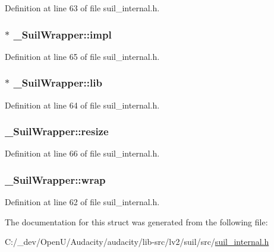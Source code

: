 Definition at line 63 of file suil\+\_\+internal.\+h.

\subsubsection[{\texorpdfstring{impl}{impl}}]{$\ast$ \+\_\+\+Suil\+Wrapper\+::impl}\hypertarget{struct___suil_wrapper_a3b9f069c2fc9e99ad07b07de0994cad7}{}\label{struct___suil_wrapper_a3b9f069c2fc9e99ad07b07de0994cad7}


Definition at line 65 of file suil\+\_\+internal.\+h.

\subsubsection[{\texorpdfstring{lib}{lib}}]{$\ast$ \+\_\+\+Suil\+Wrapper\+::lib}\hypertarget{struct___suil_wrapper_aef41349133c89e26d472c35879599cf4}{}\label{struct___suil_wrapper_aef41349133c89e26d472c35879599cf4}


Definition at line 64 of file suil\+\_\+internal.\+h.

\subsubsection[{\texorpdfstring{resize}{resize}}]{ \+\_\+\+Suil\+Wrapper\+::resize}\hypertarget{struct___suil_wrapper_a881d1aaf73b97b34059360b224b4edc3}{}\label{struct___suil_wrapper_a881d1aaf73b97b34059360b224b4edc3}


Definition at line 66 of file suil\+\_\+internal.\+h.

\subsubsection[{\texorpdfstring{wrap}{wrap}}]{ \+\_\+\+Suil\+Wrapper\+::wrap}\hypertarget{struct___suil_wrapper_afcf34e2f9166985f483b08397ca94276}{}\label{struct___suil_wrapper_afcf34e2f9166985f483b08397ca94276}


Definition at line 62 of file suil\+\_\+internal.\+h.



The documentation for this struct was generated from the following file\+:\begin{DoxyCompactItemize}
\item 
C\+:/\+\_\+dev/\+Open\+U/\+Audacity/audacity/lib-\/src/lv2/suil/src/\hyperlink{suil__internal_8h}{suil\+\_\+internal.\+h}\end{DoxyCompactItemize}
